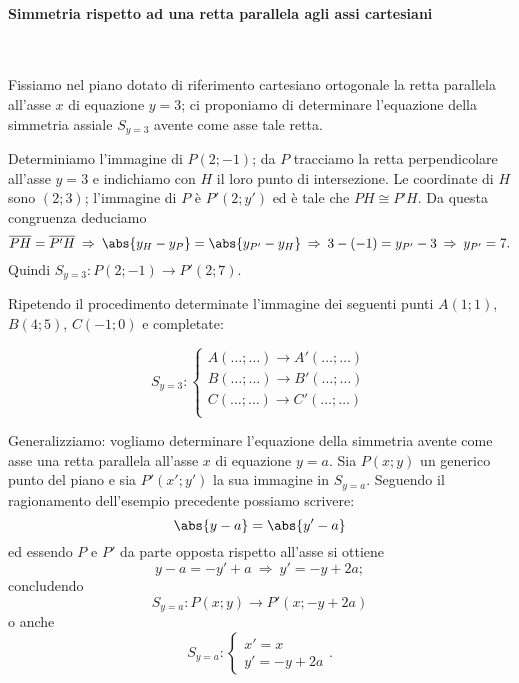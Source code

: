 \paragraph{Simmetria rispetto ad una retta parallela agli assi 
cartesiani}
~

\begin{exrig}
\begin{esempio}
Fissiamo nel piano dotato di riferimento cartesiano ortogonale la 
retta parallela all'asse $x$ di equazione $y=3$; ci proponiamo di 
determinare l'equazione della simmetria assiale $S_{y=3}$ avente come 
asse tale retta.\vspace{7pt}

\begin{figure*}[!htb]
	
\centering
\end{figure*}

Determiniamo l'immagine di $P(2;-1)$; da $P$ tracciamo la retta 
perpendicolare all'asse $y=3$ e indichiamo con $H$ il loro punto di 
intersezione. Le coordinate di $H$ sono $(2;3)$; l'immagine di $P$ è 
$P'(2;y')$ ed è tale che $PH\cong P’H$. Da questa congruenza deduciamo
\[\overline{PH}=\overline{P'H}\:\Rightarrow\:\abs{y_H-y_P} = \abs{ 
y_{P'}-y_H} \:\Rightarrow\: 3-(-1)=y_{P'}-3 \:\Rightarrow\: 
y_{P'}=7.\]
Quindi $S_{y=3}:P(2;-1)\rightarrow P'(2;7)$.

Ripetendo il procedimento determinate l'immagine dei seguenti punti 
$A(1;1)$, $B(4;5)$, $C(-1;0)$ e completate:

\[S_{y=3}:\begin{cases}A(\ldots{};\ldots{}) \rightarrow 
A'(\ldots{};\ldots{})\\
B(\ldots{};\ldots{}) \rightarrow B'(\ldots{};\ldots{})\\
C(\ldots{};\ldots{}) \rightarrow C'(\ldots{};\ldots{})\\
 \end{cases}\]
\end{esempio}
\end{exrig}

Generalizziamo: vogliamo determinare l'equazione della simmetria 
avente come asse una retta parallela all'asse $x$ di equazione $y=a$. 
Sia $P(x;y)$ un generico punto del piano e sia $P'(x';y')$ la sua 
immagine in $S_{y=a}$. Seguendo il ragionamento dell'esempio 
precedente possiamo scrivere: \[\abs{y-a} = \abs{y'-a}\]
ed essendo $P$ e $P'$ da parte opposta rispetto all'asse si ottiene
\[y-a=-y'+a\:\Rightarrow\: y'=-y+2a;\]
concludendo
\[S_{y=a}:P(x;y)\rightarrow P'(x;-y+2a)\]
o anche
\[S_{y=a}:\begin{cases}x'=x\\ y'=-y+2a \end{cases}.\]

